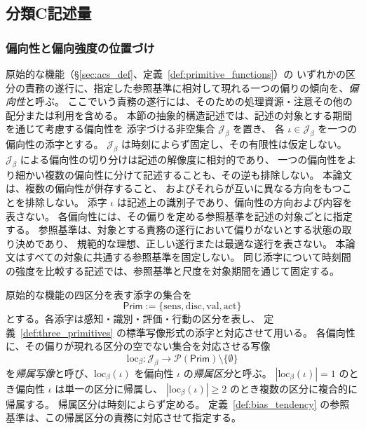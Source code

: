\subsection{分類C記述量}
\label{subsec:s5_internal_quantities}

\subsubsection{偏向性と偏向強度の位置づけ}
\label{subsec:beta_dyn}

\begin{definition}
\label{def:bias_tendency}
原始的な機能（\S\ref{sec:acs_def}、定義~\ref{def:primitive_functions}）の
いずれかの区分の責務の遂行に、指定した参照基準に相対して現れる一つの偏りの傾向を、\emph{偏向性}と呼ぶ。
ここでいう責務の遂行には、そのための処理資源・注意その他の配分または利用を含める。
本節の抽象的構造記述では、記述の対象とする期間を通じて考慮する偏向性を
添字づける非空集合 $\mathcal J_{\beta}$ を置き、
各 $\iota\in\mathcal J_{\beta}$ を一つの偏向性の添字とする。
$\mathcal J_{\beta}$ は時刻によらず固定し、その有限性は仮定しない。
$\mathcal J_{\beta}$ による偏向性の切り分けは記述の解像度に相対的であり、
一つの偏向性をより細かい複数の偏向性に分けて記述することも、その逆も排除しない。
本論文は、複数の偏向性が併存すること、
およびそれらが互いに異なる方向をもつことを排除しない。
添字 $\iota$ は記述上の識別子であり、偏向性の方向および内容を表さない。
各偏向性には、その偏りを定める参照基準を記述の対象ごとに指定する。
参照基準は、対象とする責務の遂行において偏りがないとする状態の取り決めであり、
規範的な理想、正しい遂行または最適な遂行を表さない。
本論文はすべての対象に共通する参照基準を固定しない。
同じ添字について時刻間の強度を比較する記述では、参照基準と尺度を対象期間を通じて固定する。
\end{definition}

\begin{definition}
\label{def:bias_attribution}
原始的な機能の四区分を表す添字の集合を
\[
  \mathsf{Prim}:=\{\mathrm{sens},\mathrm{disc},\mathrm{val},\mathrm{act}\}
\]
とする。各添字は感知・識別・評価・行動の区分を表し、
定義~\ref{def:three_primitives} の標準写像形式の添字と対応させて用いる。
各偏向性に、その偏りが現れる区分の空でない集合を対応させる写像
\[
  \mathrm{loc}_{\beta}:\mathcal J_{\beta}\to\mathcal P(\mathsf{Prim})\setminus\{\emptyset\}
\]
を\emph{帰属写像}と呼び、$\mathrm{loc}_{\beta}(\iota)$ を偏向性 $\iota$ の\emph{帰属区分}と呼ぶ。
$|\mathrm{loc}_{\beta}(\iota)|=1$ のとき偏向性 $\iota$ は単一の区分に帰属し、
$|\mathrm{loc}_{\beta}(\iota)|\ge2$ のとき複数の区分に複合的に帰属する。
帰属区分は時刻によらず定める。
定義~\ref{def:bias_tendency} の参照基準は、この帰属区分の責務に対応させて指定する。


\end{definition}

